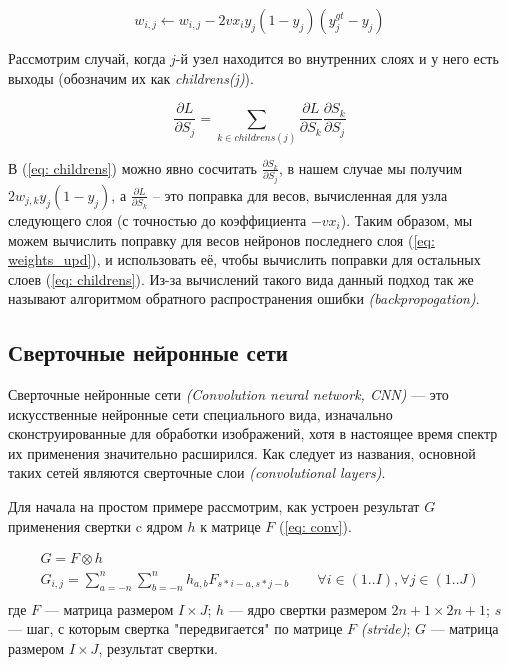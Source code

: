 \begin{equation}\label{eq: weights_upd}
    w_{i, j} \leftarrow w_{i, j} - 2 v x_i y_j (1 - y_j) (y^{gt}_j - y_j)
\end{equation}

Рассмотрим случай, когда $j$-й узел находится во внутренних слоях и 
у него есть выходы (обозначим их как \textit{childrens(j)}).

\begin{equation}\label{eq: childrens}
    \frac{\partial L}{\partial S_j} = 
    \sum_{k \in childrens(j)} \frac{\partial L}{\partial S_k} \frac{\partial S_k}{\partial S_j} 
\end{equation}


\indent
\indent
В (\ref{eq: childrens}) можно явно сосчитать 
$\frac{\partial S_k}{\partial S_j}$, в нашем случае мы получим 
$2 w_{j, k} y_j (1 - y_j)$, а $\frac{\partial L}{\partial S_k}$ -- это поправка для весов, вычисленная для узла 
следующего слоя (с точностью до коэффициента $-v x_i$). Таким образом, мы можем вычислить
поправку для весов нейронов последнего слоя (\ref{eq: weights_upd}), и использовать
её, чтобы вычислить поправки для остальных слоев
(\ref{eq: childrens}). Из-за вычислений такого вида
 данный подход так же называют алгоритмом обратного распространения ошибки \textit{(backpropogation)}.
 

\subsection{Сверточные нейронные сети}

\indent
\indent
Сверточные нейронные сети \textit{(Convolution neural network, CNN)} --- 
это искусственные нейронные сети специального вида,
изначально сконструированные для 
обработки изображений, хотя в настоящее время спектр их применения 
значительно расширился. Как следует из названия, основной таких сетей 
являются сверточные слои \textit{(convolutional layers)}.

\indent
\indent
 Для начала на простом примере рассмотрим,
 как устроен результат $G$ применения свертки c ядром $h$ 
 к матрице  $F$ (\ref{eq: conv}). 

\begin{equation}\label{eq: conv}
    \begin{gathered}
        G = F \otimes h \\
	    G_{i, j} = \sum_{a=-n}^{n} \sum_{b=-n}^{n} h_{a, b} F_{s*i - a, s*j - b} \qquad
	    \forall i \in (1..I), \forall j \in (1..J) \\
    \end{gathered}
\end{equation}
где $F$ --- матрица размером $I \times J$;
$h$ --- ядро свертки размером $2n+1 \times 2n+1$;
$s$ --- шаг, с которым свертка "передвигается" по матрице $F$ \textit{(stride)};
$G$ --- матрица размером $I \times J$, результат свертки.


